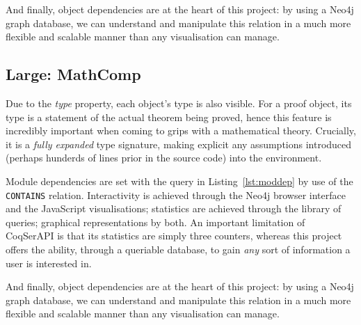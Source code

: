 And finally, object dependencies are at the heart of this project: by using a
Neo4j graph database, we can understand and manipulate this relation in a much
more flexible and scalable manner than any visualisation can manage.

\subsection{Large: MathComp}

Due to the \emph{type} property, each object's type is also visible. For a proof
object, its type is a statement of the actual theorem being proved, hence this
feature is incredibly important when coming to grips with a mathematical theory.
Crucially, it is a \emph{fully expanded} type signature, making explicit any
assumptions introduced (perhaps hunderds of lines prior in the source code) into
the environment.

Module dependencies are set with the query in Listing~\ref{lst:moddep} by use of
the \texttt{CONTAINS} relation.  Interactivity is achieved through the Neo4j
browser interface and the JavaScript visualisations; statistics are achieved
through the library of queries; graphical representations by both. An important
limitation of CoqSerAPI is that its statistics are simply three counters,
whereas this project offers the ability, through a queriable database, to gain
\emph{any} sort of information a user is interested in.

And finally, object dependencies are at the heart of this project: by using a
Neo4j graph database, we can understand and manipulate this relation in a much
more flexible and scalable manner than any visualisation can manage.

